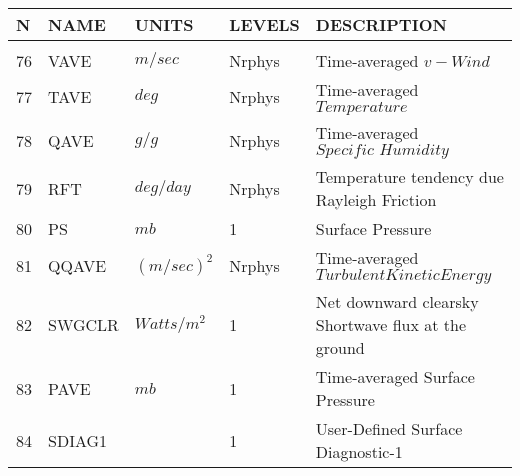\newpage
\vspace*{\fill}
\begin{tabular}{lllll}
\hline\hline
N & NAME & UNITS & LEVELS & DESCRIPTION \\
\hline

&\\
76 & VAVE     &   $m/sec$  &    Nrphys
         &\begin{minipage}[t]{3in}
          {Time-averaged $v-Wind$}
         \end{minipage}\\
77 & TAVE     &   $deg$  &    Nrphys
         &\begin{minipage}[t]{3in}
          {Time-averaged $Temperature$}
         \end{minipage}\\
78 & QAVE     &   $g/g$  &    Nrphys
         &\begin{minipage}[t]{3in}
          {Time-averaged $Specific \, \, Humidity$}
         \end{minipage}\\
79 & RFT      &    $deg/day$ &  Nrphys
         &\begin{minipage}[t]{3in}
          {Temperature tendency due Rayleigh Friction}
         \end{minipage}\\
80 & PS       &   $mb$  &    1
         &\begin{minipage}[t]{3in}
          {Surface Pressure}
         \end{minipage}\\
81 & QQAVE    &   $(m/sec)^2$  &    Nrphys
         &\begin{minipage}[t]{3in}
          {Time-averaged $Turbulent Kinetic Energy$}
         \end{minipage}\\
82 & SWGCLR   &   $Watts/m^2$  &    1  
         &\begin{minipage}[t]{3in}
          {Net downward clearsky Shortwave flux at the ground} 
         \end{minipage}\\
83 & PAVE     &   $mb$  &    1
         &\begin{minipage}[t]{3in}
          {Time-averaged Surface Pressure}
         \end{minipage}\\
84 & SDIAG1   &             &    1  
         &\begin{minipage}[t]{3in}
          {User-Defined Surface Diagnostic-1} 
         \end{minipage}\\

\end{tabular}
